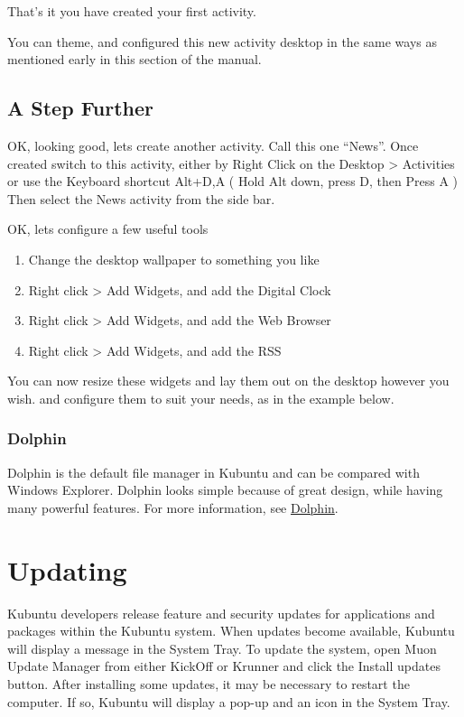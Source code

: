 \documentclass[letterpaper,10pt,english]{sphinxmanual}
\begin{document}
That's it you have created your first activity.

You can theme, and configured this new activity desktop in the same ways as mentioned early in this section of the manual.


\subsection{A Step Further}
\label{docs/basic:a-step-further}
OK, looking good, lets create another activity. Call this one ``News''. Once created switch to this activity, either by Right Click on the Desktop \textgreater{} Activities or use the Keyboard shortcut Alt+D,A ( Hold Alt down, press D, then Press A )
Then select the News activity from the side bar.

OK, lets configure a few useful tools
\begin{enumerate}
\item {} 
Change the desktop wallpaper to something you like

\item {} 
Right click \textgreater{} Add Widgets, and add the Digital Clock

\item {} 
Right click \textgreater{} Add Widgets, and add the Web Browser

\item {} 
Right click \textgreater{} Add Widgets, and add the RSS

\end{enumerate}

You can now resize these widgets and lay them out on the desktop however you wish. and configure them to suit your needs, as in the example below.



\subsubsection{Dolphin}
\label{docs/basic:dolphin}
Dolphin is the default file manager in Kubuntu and can be compared with Windows Explorer. Dolphin looks simple because of great design, while having many powerful features. For more information, see \href{https://userbase.kde.org/Special:MyLanguage/Dolphin}{Dolphin}.


\section{Updating}
\label{docs/basic:updating}
Kubuntu developers release feature and security updates for applications and packages within the Kubuntu system. When updates become available, Kubuntu will display a message in the System Tray. To update the system, open Muon Update Manager from either KickOff or Krunner and click the Install updates button. After installing some updates, it may be necessary to restart the computer. If so, Kubuntu will display a pop-up and an icon in the System Tray.
\end{document}
